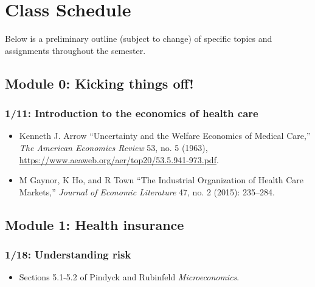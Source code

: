\documentclass[11pt,]{article}
\providecommand{\tightlist}{%
  \setlength{\itemsep}{0pt}\setlength{\parskip}{0pt}}
\begin{document}
\hypertarget{class-schedule}{%
\section{Class Schedule}\label{class-schedule}}

Below is a preliminary outline (subject to change) of specific topics
and assignments throughout the semester.

\hypertarget{module-0-kicking-things-off}{%
\subsection{Module 0: Kicking things
off!}\label{module-0-kicking-things-off}}

\hypertarget{introduction-to-the-economics-of-health-care}{%
\subsubsection{1/11: Introduction to the economics of health
care}\label{introduction-to-the-economics-of-health-care}}

\begin{itemize}
\tightlist
\item
  Kenneth J. Arrow {``Uncertainty and the {Welfare} {Economics} of
  {Medical} {Care},''} \emph{The American Economics Review} 53, no. 5
  (1963), \url{https://www.aeaweb.org/aer/top20/53.5.941-973.pdf}.
\item
  M Gaynor, K Ho, and R Town {``The {Industrial} {Organization} of
  {Health} {Care} {Markets},''} \emph{Journal of Economic Literature}
  47, no. 2 (2015): 235--284.
\end{itemize}

\hypertarget{module-1-health-insurance}{%
\subsection{Module 1: Health
insurance}\label{module-1-health-insurance}}

\hypertarget{understanding-risk}{%
\subsubsection{1/18: Understanding risk}\label{understanding-risk}}

\begin{itemize}
\tightlist
\item
  Sections 5.1-5.2 of Pindyck and Rubinfeld \emph{Microeconomics}.
\end{itemize}
\end{document}
